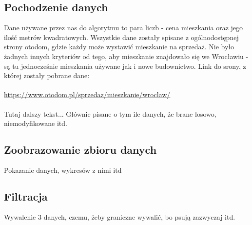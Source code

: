 	\subsection{Pochodzenie danych}
Dane używane przez nas do algorytmu to para liczb - cena mieszkania oraz jego ilość metrów kwadratowych. Wszystkie dane zostały spisane z ogólnodostępnej strony otodom, gdzie każdy może wystawić mieszkanie na sprzedaż. Nie było żadnych innych kryteriów od tego, aby mieszkanie znajdowało się we Wrocławiu - są tu jednocześnie mieszkania używane jak i nowe budownictwo. Link do srony, z której zostały pobrane dane:
\\
\\
\url{https://www.otodom.pl/sprzedaz/mieszkanie/wroclaw/}
\\
\\
Tutaj dalszy tekst... Głównie pisane o tym ile danych, że brane losowo, niemodyfikowane itd.
	\subsection{Zoobrazowanie zbioru danych}
Pokazanie danych, wykresów z nimi itd
	\subsection{Filtracja}
Wywalenie 3 danych, czemu, żeby graniczne wywalić, bo psują zazwyczaj itd.	
	

